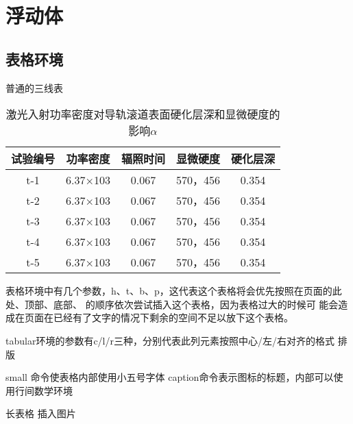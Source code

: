 \documentclass[../../main.tex]{subfiles}
\begin{document}
\section{浮动体}

\subsection{表格环境}

普通的三线表

\begin{table}[htbp]
        \newcommand{\tabincell}[2]{\begin{tabular}{@{}#1@{}}#2\end{tabular}}
        \centering
        \caption{激光入射功率密度对导轨滚道表面硬化层深和显微硬度的影响$\alpha$}
        \begin{tabular}{ccccc}
                \toprule    %
                试验编号 & 功率密度 & 辐照时间 & 显微硬度       & 硬化层深\\ 
                \midrule    %
                t-1	&6.37×103	&0.067	&570，456	&0.354\\
                t-2	&6.37×103	&0.067	&570，456	&0.354\\
                t-3	&6.37×103	&0.067	&570，456	&0.354\\
                t-4	&6.37×103	&0.067	&570，456	&0.354\\
                t-5	&6.37×103	&0.067	&570，456	&0.354\\ 
          \bottomrule   %
        \end{tabular}
        \label{data_table}
\end{table}

表格环境中有几个参数，h、t、b、p，这代表这个表格将会优先按照在页面的此
处、顶部、底部、 的顺序依次尝试插入这个表格，因为表格过大的时候可
能会造成在页面在已经有了文字的情况下剩余的空间不足以放下这个表格。


tabular环境的参数有c/l/r三种，分别代表此列元素按照中心/左/右对齐的格式
排版

small 命令使表格内部使用小五号字体
caption命令表示图标的标题，内部可以使用行间数学环境


长表格
插入图片
\end{document}

